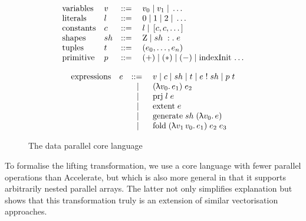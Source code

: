 \begin{figure}
\begin{minipage}[t]{0.4\textwidth}
\begin{displaymath}
\begin{array}{llcl}
  $variables$   & v  & \bnfdef{} & v_0 \alt{} v_1 \alt{} \dots              \\
  $literals$    & l  & \bnfdef{} & 0 \alt{} 1 \alt{} 2 \alt{} \dots         \\
  $constants$   & c  & \bnfdef{} & l \alt{} \left[c,c,\dots\right]          \\
  $shapes$      & sh & \bnfdef{} & $Z$ \alt{} sh\; :.\; e                   \\
  $tuples$      & t  & \bnfdef{} & (e_0,\dots,e_n)                          \\
  $primitive$   & p  & \bnfdef{} & (+) \alt{} (*) \alt (-)
                                       \alt{} $indexInit$\,\,\dots
\end{array}
\end{displaymath}
\end{minipage}
\begin{minipage}[t]{0.5\textwidth}
\begin{displaymath}
\begin{array}{llcl}
  $expressions$ & e  & \bnfdef{} & v
                          \alt{}   c
                          \alt{}   sh
                          \alt{}   t
                          \alt{}   e\; !\; sh
                          \alt{}   p\; t                                    \\
                &    &    \alt{} & (\uplambda v_0.\, e_1)\; e_2             \\
                &    &    \alt{} & $prj$\; l\; e                            \\
                &    &    \alt{} & $extent$\; e                             \\
                &    &    \alt{} & $generate$\; sh\; (\uplambda v_0.\, e)   \\
                &    &    \alt{} & $fold$\; (\uplambda v_1\, v_0.\, e_1)\; e_2\; e_3 \\
\end{array}
\end{displaymath}
\end{minipage}
\caption{The data parallel core language}
\label{fig:language-def}
\end{figure}
%
To formalise the lifting transformation, we use a core language with fewer parallel operations than Accelerate, but which is also more general in that it supports arbitrarily nested parallel arrays. The latter not only simplifies explanation but shows that this transformation truly is an extension of similar vectorisation approaches.

